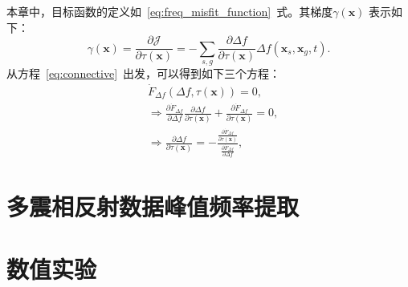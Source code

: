 本章中，目标函数的定义如~\ref{eq:freq_misfit_function}~式。其梯度$\gamma(\mathbf{x})$
表示如下：
\begin{equation}
	\gamma(\mathbf{x})=\frac{\partial\mathcal{J}}{\partial \tau(\mathbf{x})}
	=-\sum_{s,g}\frac{\partial \Delta f}{\partial \tau(\mathbf{x})}
	\Delta f(\mathbf{x}_s,\mathbf{x}_g,t).
\end{equation}
从方程~\ref{eq:connective}~出发，可以得到如下三个方程：
\begin{equation}
	\begin{aligned}
		 &\dot{F}_{\Delta f}(\Delta f,\tau(\mathbf{x}))=0, \\
		&\Rightarrow \frac{\partial \dot{F}_{\Delta f}}{\partial \Delta f} 
		\frac{\partial \Delta f}{\partial \tau(\mathbf{x})} + 
		\frac{\partial \dot{F}_{\Delta f}}{\partial\tau(\mathbf{x})} =0, \\
		&\Rightarrow \frac{\partial \Delta f}{\partial \tau(\mathbf{x})} =
		-\frac{\frac{\partial \dot{F}_{\Delta f}}{\partial\tau(\mathbf{x})}}
		{\frac{\partial \dot{F}_{\Delta f}}{\partial \Delta f}},
	\end{aligned}
\end{equation}


\vspace{0.5cm}
\section{多震相反射数据峰值频率提取}
\section{数值实验}

